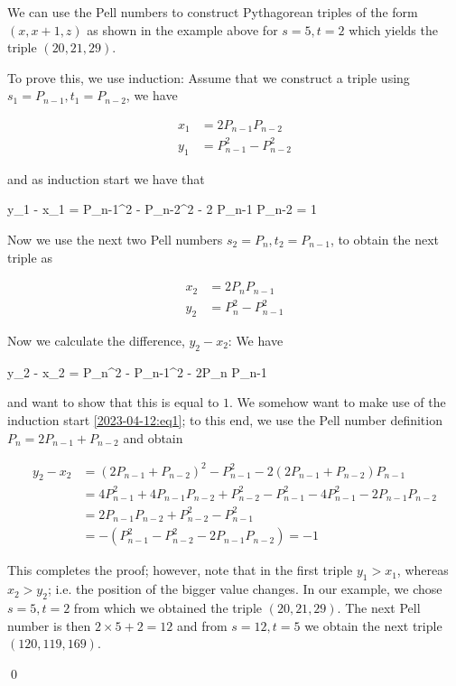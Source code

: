 We can use the Pell numbers to construct Pythagorean triples of the form $(x, x+1, z)$ as shown in the example above for $s = 5, t=2$ which yields the triple $(20, 21, 29)$.

To prove this, we use induction: Assume that we construct a triple using $s_1 = P_{n-1}, t_1 = P_{n-2}$, we have

\begin{align*}
    x_1 &= 2P_{n-1} P_{n-2} \\
    y_1 &= P_{n-1}^2 - P_{n-2}^2
\end{align*}

and as induction start we have that

\be\label{2023-04-12:eq1}
y_1 - x_1 = P_{n-1}^2 - P_{n-2}^2 - 2 P_{n-1} P_{n-2} = 1
\ee

Now we use the next two Pell numbers $s_2 = P_{n}, t_2 = P_{n-1}$, to obtain the next triple as

\begin{align*}
    x_2 &= 2P_{n} P_{n-1} \\
    y_2 &= P_{n}^2 - P_{n-1}^2
\end{align*}

Now we calculate the difference, $y_2 - x_2$: We have

\bee
    y_2 - x_2 = P_{n}^2 - P_{n-1}^2 - 2P_{n} P_{n-1}
\eee

and want to show that this is equal to $1$. We somehow want to make use of the induction start \ref{2023-04-12:eq1}; to this end, we use the Pell number definition $P_n = 2 P_{n-1} + P_{n-2}$ and obtain

\begin{align*}
    y_2 - x_2 &= (2 P_{n-1} + P_{n-2})^2 - P_{n-1}^2 - 2(2 P_{n-1} + P_{n-2}) P_{n-1} \\
    &= 4 P_{n-1}^2 + 4 P_{n-1} P_{n-2} + P_{n-2}^2 - P_{n-1}^2 - 4 P_{n-1}^2 - 2 P_{n-1} P_{n-2} \\
    &= 2 P_{n-1} P_{n-2} + P_{n-2}^2 - P_{n-1}^2 \\
    &= - (P_{n-1}^2 - P_{n-2}^2 - 2 P_{n-1} P_{n-2} ) = -1
\end{align*}

This completes the proof; however, note that in the first triple $y_1 > x_1$, whereas $x_2 > y_2$; i.e. the position of the bigger value changes. In our example, we chose $s = 5, t=2$ from which we obtained the triple $(20, 21, 29)$. The next Pell number is then $2 \times 5 + 2 = 12$ and from $s = 12, t = 5$ we obtain the next triple $(120, 119, 169)$. 

\qed



